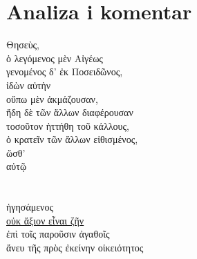 \documentclass[a4paper,12pt,twoside]{report}
\begin{document}
\section*{Analiza i komentar}


{\large
\begin{greek}
\noindent Θησεὺς, \\
\tabto{2em} ὁ λεγόμενος μὲν Αἰγέως \\
\tabto{2em} γενομένος δ' ἐκ Ποσειδῶνος, \\
ἰδὼν αὐτὴν \\
\tabto{2em} οὔπω μὲν ἀκμάζουσαν, \\
\tabto{2em} ἤδη δὲ τῶν ἄλλων διαφέρουσαν\\
τοσοῦτον ἡττήθη τοῦ κάλλους, \\
ὁ κρατεῖν τῶν ἄλλων εἰθισμένος, \\
\tabto{2em} ὥσθ' \\
\tabto{4em}  αὐτῷ \\
\tabto{6em}  \\
\tabto{6em}  \\
\tabto{2em} ἡγησάμενος \\
\tabto{4em} \underline{οὐκ ἄξιον εἶναι ζῆν} \\
\tabto{6em} ἐπὶ τοῖς παροῦσιν ἀγαθοῖς \\
\tabto{6em} ἄνευ τῆς πρὸς ἐκείνην οἰκειότητος\\

\end{greek}
}
\end{document}
